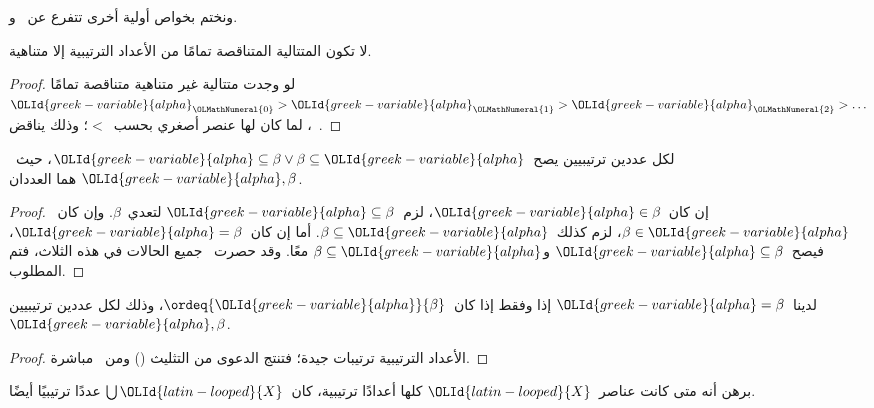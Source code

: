 \documentclass[../../../include/open-logic-section]{subfiles}
\begin{document}
ونختم بخواص أولية أخرى تتفرع عن~
و.

\begin{prop}
لا تكون المتتالية المتناقصة تمامًا من الأعداد الترتيبية إلا متناهية.
\end{prop}

\begin{proof}
لو وجدت متتالية غير متناهية متناقصة تمامًا
$\OLId{greek-variable}{alpha}_\OLMathNumeral{0} > \OLId{greek-variable}{alpha}_\OLMathNumeral{1} > \OLId{greek-variable}{alpha}_\OLMathNumeral{2} > \ldots$، لما كان لها عنصر أصغري
بحسب~$<$؛ وذلك يناقض~.
\end{proof}

\begin{prop}
لكل عددين ترتيبيين يصح~$\OLId{greek-variable}{alpha} \subseteq \beta \lor \beta \subseteq \OLId{greek-variable}{alpha}$،
حيث~$\OLId{greek-variable}{alpha}, \beta$ هما العددان.
\end{prop}

\begin{proof}
إن كان~$\OLId{greek-variable}{alpha} \in \beta$، لزم~$\OLId{greek-variable}{alpha} \subseteq \beta$ لتعدي~$\beta$.
وإن كان~$\beta \in \OLId{greek-variable}{alpha}$، لزم كذلك~$\beta \subseteq \OLId{greek-variable}{alpha}$.
أما إن كان~$\OLId{greek-variable}{alpha} = \beta$، فيصح~$\OLId{greek-variable}{alpha} \subseteq \beta$
و$\beta \subseteq \OLId{greek-variable}{alpha}$ معًا. وقد حصرت~
جميع الحالات في هذه الثلاث، فتم المطلوب.
\end{proof}

\begin{prop}
لدينا~$\OLId{greek-variable}{alpha} = \beta$ إذا وفقط إذا كان~$\ordeq{\OLId{greek-variable}{alpha}}{\beta}$،
وذلك لكل عددين ترتيبيين~$\OLId{greek-variable}{alpha}, \beta$.
\end{prop}

\begin{proof}
الأعداد الترتيبية ترتيبات جيدة؛ فتنتج الدعوى من التثليث
() ومن~ مباشرة.
\end{proof}

\begin{prob}
برهن أنه متى كانت عناصر~$\OLId{latin-looped}{X}$ كلها أعدادًا ترتيبية، كان~$\bigcup \OLId{latin-looped}{X}$
عددًا ترتيبيًا أيضًا.
\end{prob}
\end{document}
